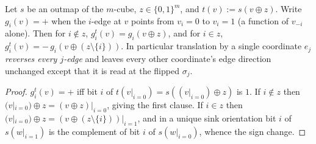 
\begin{lemma}\label{b3:translate}
Let $s$ be an outmap of the $m$-cube, $z\in\{0,1\}^{m}$, and
$t(v):=s(v\oplus z)$. Write $g_i(v)=+$ when the $i$-edge at $v$ points from
$v_i=0$ to $v_i=1$ (a function of $v_{-i}$ alone). Then for $i\notin z$,
$g^{t}_i(v)=g_i(v\oplus z)$, and for $i\in z$,
$g^{t}_i(v)=-\,g_i(v\oplus(z\setminus\{i\}))$. In particular translation by a
single coordinate $e_j$ \emph{reverses every $j$-edge} and leaves every other
coordinate's edge direction unchanged except that it is read at the flipped
$\sigma_j$.
\end{lemma}

\begin{proof}
$g^t_i(v)=+$ iff bit $i$ of $t(v|_{i=0})=s((v|_{i=0})\oplus z)$ is $1$. If
$i\notin z$ then $(v|_{i=0})\oplus z=(v\oplus z)|_{i=0}$, giving the first
clause. If $i\in z$ then $(v|_{i=0})\oplus z=(v\oplus(z\setminus\{i\}))|_{i=1}$,
and in a unique sink orientation bit $i$ of $s(w|_{i=1})$ is the complement of
bit $i$ of $s(w|_{i=0})$, whence the sign change.
\end{proof}

